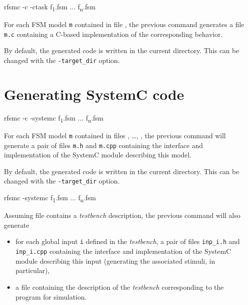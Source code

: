 \begin{FVerbatim}[commandchars=\\\{\}]
rfsmc -c -ctask f\textsubscript{1}.fsm ... f\textsubscript{n}.fsm
\end{FVerbatim}

For each FSM model \verb|m| contained in file , the previous command generates a file
\verb|m.c| containing a C-based implementation of the corresponding behavior.

By default, the generated code is written in the current directory. This can be changed with the
\verb|-target_dir| option.

\section{Generating SystemC code}
\label{sec:gener-syst-code}

\begin{FVerbatim}[commandchars=\\\{\}]
rfsmc -c -systemc f\textsubscript{1}.fsm ... f\textsubscript{n}.fsm
\end{FVerbatim}

For each FSM model \texttt{m} contained in files , \ldots, ,
the previous command will generate a pair of files \verb|m.h| and \verb|m.cpp| containing the
  interface and implementation of the SystemC module describing this model.

By default, the generated code is written in the current directory. This can be changed with the
\verb|-target_dir| option.

\begin{FVerbatim}[commandchars=\\\{\}]
rfsmc -systemc f\textsubscript{1}.fsm ... f\textsubscript{n}.fsm
\end{FVerbatim}

Assuming file  contains a \emph{testbench} description, the previous command will
also generate  
\begin{itemize}
\item for each global input \verb|i| defined in the \emph{testbench}, a pair of files \verb|inp_i.h|
  and \verb|inp_i.cpp| containing the interface and implementation of the SystemC module describing
  this input (generating the associated stimuli, in particular),
\item a file  containing the description of the \emph{testbench} corresponding to the
  program for simulation.
\end{itemize}

